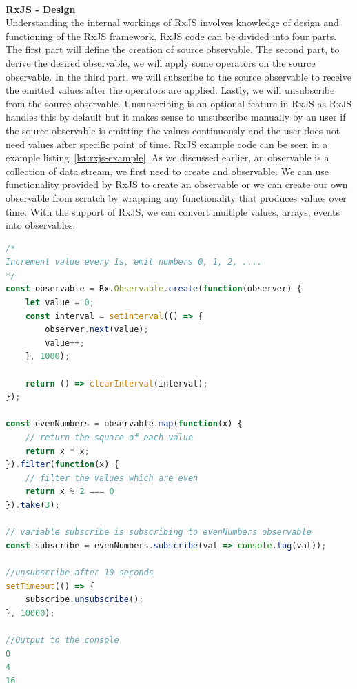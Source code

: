 \leavevmode
\\
\textbf{RxJS - Design}
\\
Understanding the internal workings of RxJS involves knowledge of design and functioning of the RxJS framework. RxJS code can be divided into four parts. The first part will define the creation of source observable. The second part, to derive the desired observable, we will apply some operators on the source observable. In the third part, we will subscribe to the source observable to receive the emitted values after the operators are applied. Lastly, we will unsubscribe from the source observable. Unsubscribing is an optional feature in RxJS as RxJS handles this by default but it makes sense to unsubscribe manually by an user if the source observable is emitting the values continuously and the user does not need values after specific point of time. RxJS example code can be seen in a example listing~\ref{lst:rxjs-example}. As we discussed earlier, an observable is a collection of data stream, we first need to create and observable. We can use functionality provided by RxJS to create an observable or we can create our own observable from scratch by wrapping any functionality that produces values over time. With the support of RxJS, we can convert multiple values, arrays, events into observables. 

\begin{lstlisting}[language=JavaScript, caption=RxJS example, label={lst:rxjs-example}]
/*
Increment value every 1s, emit numbers 0, 1, 2, ....
*/
const observable = Rx.Observable.create(function(observer) {
    let value = 0;
    const interval = setInterval(() => {
        observer.next(value);
        value++;
    }, 1000);

    return () => clearInterval(interval);
});

const evenNumbers = observable.map(function(x) {
	// return the square of each value
    return x * x;
}).filter(function(x) {
	// filter the values which are even
    return x % 2 === 0
}).take(3);

// variable subscribe is subscribing to evenNumbers observable
const subscribe = evenNumbers.subscribe(val => console.log(val));

//unsubscribe after 10 seconds
setTimeout(() => {
	subscribe.unsubscribe();
}, 10000);

//Output to the console
0
4
16
\end{lstlisting}

